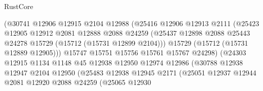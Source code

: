 \begin{lexlean}{RustCore}
\begin{coremodule}
                                (@30741
                                  @12906
                                  @12915
                                  @2104
                                  @12988
                                  (@25416
                                    @12906
                                    @12913
                                    @2111
                                    (@25423
                                      @12905
                                      @12912
                                      @2081
                                      @12888
                                      @2088
                                      @24259
                                      (@25437
                                        @12898
                                        @2088
                                        @25443
                                        @24278
                                        @15729
                                        (@15712 (@15731 @12899 @2104)))
                                      @15729
                                      (@15712 (@15731 @12889 @12905)))
                                    @15747
                                    @15751
                                    @15756
                                    @15761
                                    @15767
                                    @24298)
                                  (@24303
                                    @12915
                                    @1134
                                    @1148
                                    @45
                                    @12938
                                    @12950
                                    @12974
                                    @12986
                                    (@30788
                                      @12938
                                      @12947
                                      @2104
                                      @12950
                                      (@25483
                                        @12938
                                        @12945
                                        @2171
                                        (@25051
                                          @12937
                                          @12944
                                          @2081
                                          @12920
                                          @2088
                                          @24259
                                          (@25065
                                            @12930

\end{coremodule}
\end{lexlean}
